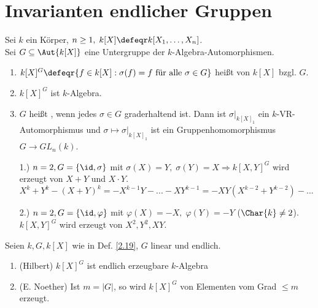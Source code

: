 \section{Invarianten endlicher Gruppen}

\begin{DefBem}
\label{2.19}
  Sei $k$ ein Körper, $n \ge 1, \; k[X] \defeqr k[X_1, \dots, X_n]$.\\
  Sei $G \subseteq \Aut{k[X]}$ eine Untergruppe der
  $k$-Algebra-Automorphismen.
  \begin{enumerate}
    \item $k[X]^G \defeqr \{f \in k[X]: \sigma (f) = f \text{ für alle } \sigma
          \in G\}$ heißt  von $k[X]$
          bzgl. $G$.
    \item $k[X]^G$ ist $k$-Algebra.
    \item $G$ heißt , wenn jedes $\sigma \in G$ graderhaltend ist. Dann
          ist $\sigma|_{k[X]_1}$ ein $k$-VR-Automorphismus und $\sigma \mapsto
          \sigma|_{k[X]_1}$ ist ein Gruppenhomomorphismus $G \to GL_n(k)$.
  \end{enumerate}
\end{DefBem}

\begin{nnBsp}
  \begin{enumerate}
    \item[1.)] $n=2, G = \{\id, \sigma\}$ mit $\sigma(X) = Y, \; \sigma(Y) = X
               \Rightarrow k[X,Y]^G$ wird erzeugt von $X+Y$ und $X \cdot Y$.\\
               $X^k+Y^k - (X + Y)^k = -X^{k-1} Y - ... - X Y^{k-1} = -X Y
               (X^{k-2} + Y^{k-2}) - ...$
    \item[2.)] $n=2, G = \{\id, \varphi\}$ mit $\varphi(X) = -X, \; \varphi(Y) =
               -Y$ ($\Char{k} \not= 2$).\\
               $k[X,Y]^G$ wird erzeugt von $X^2, Y^2, XY$.
  \end{enumerate}
\end{nnBsp}

\begin{Satz}
  Seien $k, G, k[X]$ wie in Def. \ref{2.19}, $G$ linear und endlich.
  \begin{enumerate}
    \item (Hilbert) $k[X]^G$ ist endlich erzeugbare $k$-Algebra
    \item (E. Noether) Ist $m = |G|$, so wird $k[X]^G$ von Elementen vom Grad
          $\le m$ erzeugt.
  \end{enumerate}
\end{Satz}

